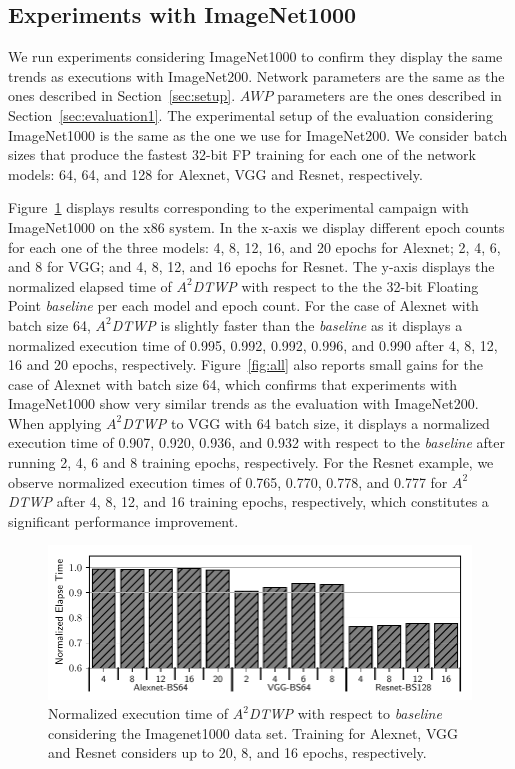 \subsection{Experiments with ImageNet1000}
\label{sec:ImageNet1000}
We run experiments considering ImageNet1000 to confirm they display the same trends as executions with ImageNet200. 
Network parameters are the same as the ones described in Section~\ref{sec:setup}.
$AWP$ parameters are the ones described in Section~\ref{sec:evaluation1}.
The experimental setup of the evaluation considering ImageNet1000 is the same as the one we use for ImageNet200.
We consider batch sizes that produce the fastest 32-bit FP training for each one of the network models: 64, 64, and 128 for Alexnet, VGG and Resnet, respectively.


Figure~\ref{fig:ImageNet1000} displays results corresponding to the experimental campaign with ImageNet1000 on the x86 system.
In the x-axis we display different epoch counts for each one of the three models: 4, 8, 12, 16, and 20 epochs for Alexnet; 2, 4, 6, and 8 for VGG; and 4, 8, 12, and 16 epochs for Resnet.
The y-axis displays the normalized elapsed time of \textit{$A^2$DTWP} with respect to the the 32-bit Floating Point \textit{baseline} per each model and epoch count.
For the case of Alexnet with batch size 64, \textit{$A^2$DTWP} is slightly faster than the \textit{baseline} as it displays a normalized execution time of 0.995, 0.992, 0.992, 0.996, and 0.990 after 4, 8, 12, 16 and 20 epochs, respectively.
Figure~\ref{fig:all} also reports small gains for the case of Alexnet with batch size 64, which confirms that experiments with ImageNet1000 show very similar trends as the evaluation with ImageNet200.
When applying \textit{$A^2$DTWP} to VGG with 64 batch size, it displays a normalized execution time of 0.907, 0.920, 0.936, and 0.932 with respect to the \textit{baseline} after running 2, 4, 6 and 8 training epochs, respectively.
For the Resnet example, we observe normalized execution times of 0.765, 0.770, 0.778, and 0.777 for \textit{$A^2$DTWP} after 4, 8, 12, and 16 training epochs, respectively,
which constitutes a significant performance improvement.

\begin{figure}%
    \centerline{\includegraphics[scale=0.85]{bitpack/figs/imagenet-1k-3net.pdf}}
    \caption{Normalized execution time of \textit{$A^2$DTWP} with respect to \textit{baseline} considering the Imagenet1000 data set. Training for Alexnet, VGG and Resnet considers up to 20, 8, and 16 epochs, respectively.}
    \label{fig:ImageNet1000}
\end{figure}


